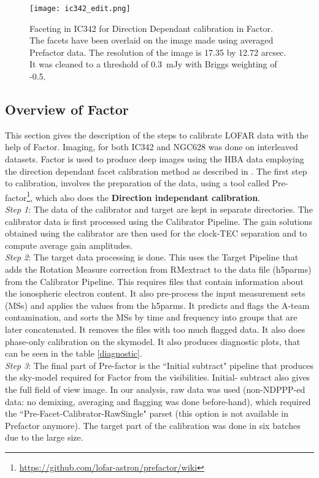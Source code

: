 \documentclass[../main/thesis_msc.tex]{subfiles}
\begin{document}
\begin{figure}[h]
\centering
\texttt{[image: ic342\_edit.png]}
\caption{Faceting in IC342 for Direction Dependant calibration in Factor. The facets have been overlaid on the image made using averaged Prefactor data. The resolution of the image is 17.35 by 12.72 arcsec. It was cleaned to a threshold of 0.3~mJy with Briggs weighting of -0.5. }
\label{ic_facets}
\end{figure}


\subsection{Overview of Factor}
This section gives the description of the steps to calibrate LOFAR data with the help of Factor. Imaging, for both IC342 and NGC628 was done on interleaved datasets. Factor is used to produce deep images using the HBA data employing the direction dependant facet calibration method as described in \citep{facet}. 
\noindent The first step to calibration, involves the preparation of the data, using a tool called Pre-factor\footnote{\url{https://github.com/lofar-astron/prefactor/wiki}}, which also does the \textbf{Direction independant calibration}. \\
\noindent \textit{Step 1}: The data of the calibrator and target are kept in separate directories. The calibrator data is first processed using the Calibrator Pipeline. The gain solutions obtained using the calibrator are then used for the clock-TEC separation and to compute average gain amplitudes.\\
\textit{Step 2}: The target data processing is done. This uses the Target Pipeline that adds the Rotation Measure correction from RMextract to the data file (h5parms) from the Calibrator Pipeline. This requires files that contain information about the ionospheric electron content. It also pre-process the input measurement sets (MSs) and applies the values from the h5parms. It predicts and flags the A-team contamination, and sorts the MSs by time and frequency into groups that are later concatenated. It removes the files with too much flagged data. It also does phase-only calibration on the skymodel. It also produces diagnostic plots, that can be seen in the table \ref{diagnostic}.\\
\textit{Step 3}: The final part of Pre-factor is the ``Initial subtract" pipeline that produces the sky-model required for Factor from the visibilities. Initial- subtract also gives the full field of view image. In our analysis, raw data was used (non-NDPPP-ed data: no demixing, averaging and flagging was done before-hand), which required the ``Pre-Facet-Calibrator-RawSingle" parset (this option is not available in Prefactor anymore). The target part of the calibration was done in six batches due to the large size.\\
\end{document}
